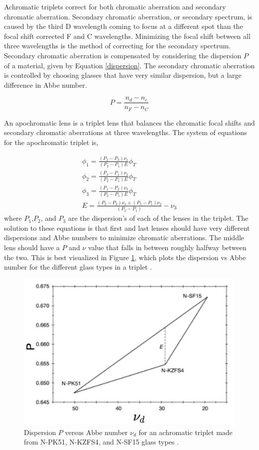 Achromatic triplets correct for both chromatic aberration and secondary chromatic aberration. Secondary chromatic aberration, or secondary spectrum, is caused by the third D wavelength coming to focus at a different spot than the focal shift corrected F and C wavelengths. Minimizing the focal shift between all three wavelengths is the method of correcting for the secondary spectrum. Secondary chromatic aberration is compensated by considering the dispersion $P$ of a material, given by Equation \ref{dispersion}. The secondary chromatic aberration is controlled by choosing glasses that have very similar dispersion, but a large difference in Abbe number. 

\begin{equation}
    P=\frac{n_d-n_c}{n_F-n_C}
    \label{dispersion}
\end{equation}



An apochromatic lens is a triplet lens that balances the chromatic focal shifts and secondary chromatic aberrations at three wavelengths. The system of equations for the apochromatic triplet is,


\begin{eqnarray}
       \phi_1=\frac{(P_2-P_3)\nu_1}{(P_2-P_1)E}\phi_T \\
       \phi_2=\frac{(P_3-P_1)\nu_2}{(P_2-P_1)E}\phi_T \\
       \phi_3=\frac{(P_1-P_2)\nu_3}{(P_2-P_1)E}\phi_T \\
       E=\frac{(P_2-P_3)\nu_1+(P_3-P_1)\nu_2}{(P_2-P_1)}-\nu_3
\end{eqnarray}
where $P_1$,$P_2$, and $P_3$ are the dispersion's of each of the lenses in the triplet. The solution to these equations is that first and last lenses should have very different dispersions and Abbe numbers to minimize chromatic aberrations. The middle lens should have a $P$ and $\nu$ value that falls in between roughly halfway between the two. This is best visualized in Figure \ref{fig:tripletPV}, which plots the dispersion vs Abbe number for the different glass types in a triplet \citep{kingslake2009lens}. 
\begin{figure}
    \centering
    \includegraphics[width=.6\textwidth]{Chapter Materials/Chapter Three Materials/tripletPV.png}
    \caption{Dispersion $P$ versus Abbe number $\nu_d$ for an achromatic triplet made from N-PK51, N-KZFS4, and N-SF15 glass types \citep{kingslake2009lens}.} 
    \label{fig:tripletPV}
\end{figure}

